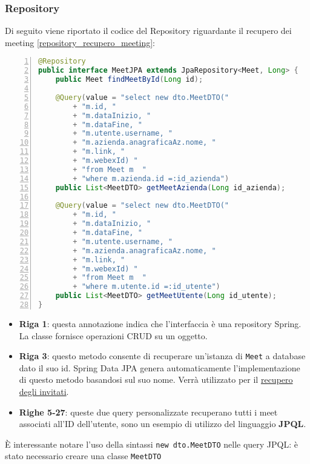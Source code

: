 \subsubsection{Repository}
Di seguito viene riportato il codice del Repository riguardante il recupero dei meeting \ref{repository_recupero_meeting}: 
\begin{lstlisting}[language=java, frame=lines, basicstyle=\ttfamily\scriptsize, numbers=left, 
    label={repository_recupero_meeting}, caption={repository recupero meeting}]
@Repository
public interface MeetJPA extends JpaRepository<Meet, Long> {
    public Meet findMeetById(Long id);

    @Query(value = "select new dto.MeetDTO("
        + "m.id, "
        + "m.dataInizio, "
        + "m.dataFine, "
        + "m.utente.username, "
        + "m.azienda.anagraficaAz.nome, "
        + "m.link, "
        + "m.webexId) "
        + "from Meet m  "
        + "where m.azienda.id =:id_azienda")
    public List<MeetDTO> getMeetAzienda(Long id_azienda);
    
    @Query(value = "select new dto.MeetDTO("
        + "m.id, "
        + "m.dataInizio, "
        + "m.dataFine, "
        + "m.utente.username, "
        + "m.azienda.anagraficaAz.nome, "
        + "m.link, "
        + "m.webexId) "
        + "from Meet m  "
        + "where m.utente.id =:id_utente")
    public List<MeetDTO> getMeetUtente(Long id_utente);
}
\end{lstlisting}
\begin{itemize}
    \item \textbf{Riga 1}: questa annotazione indica che l'interfaccia è una repository Spring. La classe fornisce operazioni CRUD su un oggetto. 
    \cite{RepositorySpring}

    \item \textbf{Riga 3}: questo metodo consente di recuperare un'istanza di \texttt{Meet} a database dato il suo id. Spring Data JPA
    genera automaticamente l'implementazione di questo metodo basandosi sul suo nome. Verrà utilizzato per il 
    \hyperref[sec:recupero_invitati_backend]{recupero degli invitati}.

    \item \textbf{Righe 5-27}: queste due query personalizzate recuperano tutti i meet associati all'ID dell'utente, sono un esempio di utilizzo
    del linguaggio \textbf{JPQL}. 
\end{itemize}
È interessante notare l'uso della sintassi \texttt{new dto.MeetDTO} nelle query JPQL: è stato necessario creare una classe \texttt{MeetDTO} 
